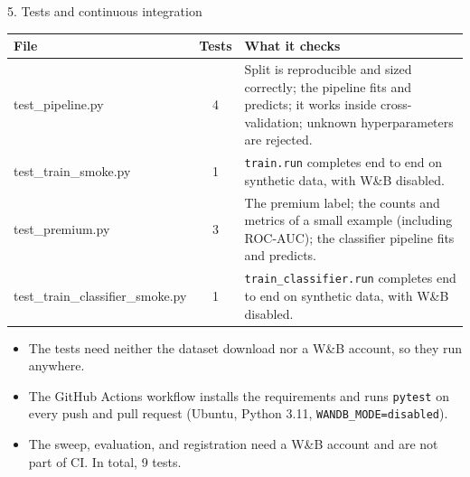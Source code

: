 \begin{frame}{5. Tests and continuous integration}
\begingroup\footnotesize
\begin{tabularx}{\textwidth}{>{\ttfamily}l c X}
\normalfont\bfseries File & \bfseries Tests & \bfseries What it checks \\
\toprule
test\_pipeline.py & 4 & Split is reproducible and sized correctly; the pipeline fits and predicts; it works inside cross-validation; unknown hyperparameters are rejected. \\
\addlinespace[0.2em]
test\_train\_smoke.py & 1 & \texttt{train.run} completes end to end on synthetic data, with W\&B disabled. \\
\addlinespace[0.2em]
test\_premium.py & 3 & The premium label; the counts and metrics of a small example (including ROC-AUC); the classifier pipeline fits and predicts. \\
\addlinespace[0.2em]
test\_train\_classifier\_smoke.py & 1 & \texttt{train\_classifier.run} completes end to end on synthetic data, with W\&B disabled. \\
\bottomrule
\end{tabularx}
\par\endgroup
\vspace{0.6em}
\begin{itemize}\footnotesize
\item The tests need neither the dataset download nor a W\&B account, so they run anywhere.
\item The GitHub Actions workflow installs the requirements and runs \texttt{pytest} on every push and pull request (Ubuntu, Python 3.11, \texttt{WANDB\_MODE=disabled}).
\item The sweep, evaluation, and registration need a W\&B account and are not part of CI. In total, 9 tests.
\end{itemize}
\coursefooter
\end{frame}

